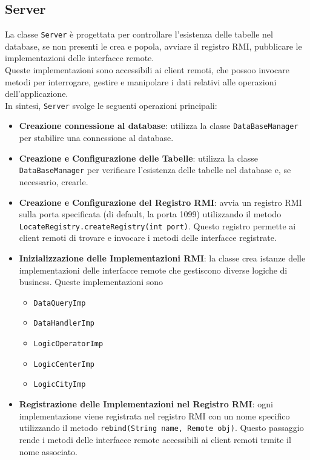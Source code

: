 \subsection{Server}
La classe \texttt{Server} è progettata per controllare l'esistenza delle tabelle nel database, se non presenti le crea e popola,
avviare il registro RMI, pubblicare le implementazioni delle interfacce remote.\\
Queste implementazioni sono accessibili ai client remoti, che possoo invocare metodi per interrogare, gestire e manipolare i dati relativi alle operazioni dell'applicazione.\\
In sintesi, \texttt{Server} svolge le seguenti operazioni principali:
\begin{itemize}
      \item \textbf{Creazione connessione al database}: utilizza la classe \texttt{DataBaseManager} per stabilire una connessione al database.
      \item \textbf{Creazione e Configurazione delle Tabelle}: utilizza la classe \texttt{DataBaseManager} per verificare l'esistenza delle tabelle nel database e, se necessario, crearle.
      \item \textbf{Creazione e Configurazione del Registro RMI}: avvia un registro RMI sulla porta specificata (di default, la porta 1099) utilizzando il metodo\\
            \texttt{LocateRegistry.createRegistry(int port)}. Questo registro permette ai client remoti di trovare e invocare i metodi delle interfacce registrate.
      \item \textbf{Inizializzazione delle Implementazioni RMI}: la classe crea istanze delle implementazioni delle interfacce remote che gestiscono diverse logiche di business.
            Queste implementazioni sono
            \begin{itemize}
                  \item \texttt{DataQueryImp}
                  \item \texttt{DataHandlerImp}
                  \item \texttt{LogicOperatorImp}
                  \item \texttt{LogicCenterImp}
                  \item \texttt{LogicCityImp}
            \end{itemize}
      \item \textbf{Registrazione delle Implementazioni nel Registro RMI}: ogni implementazione viene registrata nel registro RMI con un nome specifico utilizzando il metodo
            \texttt{rebind(String name, Remote obj)}. Questo passaggio rende i metodi delle interfacce remote accessibili ai client remoti trmite il nome associato.
\end{itemize}


